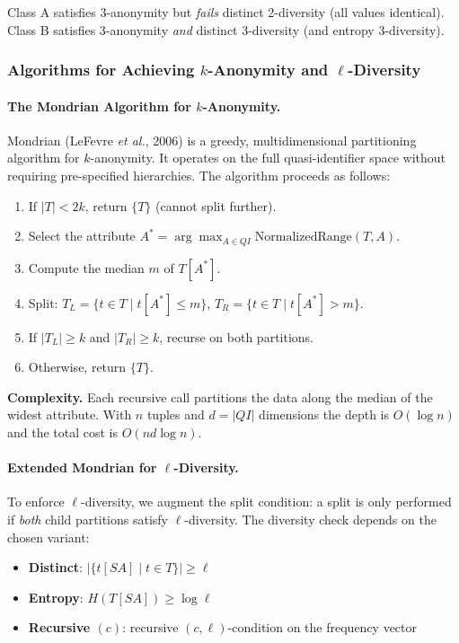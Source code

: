 Class A satisfies 3-anonymity but \emph{fails} distinct 2-diversity (all values identical). Class B satisfies 3-anonymity \emph{and} distinct 3-diversity (and entropy 3-diversity).

\subsubsection{Algorithms for Achieving $k$-Anonymity and $\ell$-Diversity}
\label{sec:kanon_algorithms}

\paragraph{The Mondrian Algorithm for $k$-Anonymity.}

Mondrian (LeFevre \emph{et al.}, 2006) is a greedy, multidimensional partitioning algorithm for $k$-anonymity. It operates on the full quasi-identifier space without requiring pre-specified hierarchies. The algorithm proceeds as follows:

\begin{enumerate}
  \item If $|T| < 2k$, return $\{T\}$ (cannot split further).
  \item Select the attribute $A^* = \arg\max_{A \in QI} \mathrm{NormalizedRange}(T, A)$.
  \item Compute the median $m$ of $T[A^*]$.
  \item Split: $T_L = \{t \in T \mid t[A^*] \leq m\}$, $T_R = \{t \in T \mid t[A^*] > m\}$.
  \item If $|T_L| \geq k$ and $|T_R| \geq k$, recurse on both partitions.
  \item Otherwise, return $\{T\}$.
\end{enumerate}

\textbf{Complexity.} Each recursive call partitions the data along the median of the widest attribute. With $n$ tuples and $d = |QI|$ dimensions the depth is $O(\log n)$ and the total cost is $O(nd \log n)$.

\paragraph{Extended Mondrian for $\ell$-Diversity.}

To enforce $\ell$-diversity, we augment the split condition: a split is only performed if \emph{both} child partitions satisfy $\ell$-diversity. The diversity check depends on the chosen variant:
\begin{itemize}
  \item \textbf{Distinct}: $|\{t[SA] \mid t \in T\}| \geq \ell$
  \item \textbf{Entropy}: $H(T[SA]) \geq \log \ell$
  \item \textbf{Recursive $(c)$}: recursive $(c, \ell)$-condition on the frequency vector
\end{itemize}

